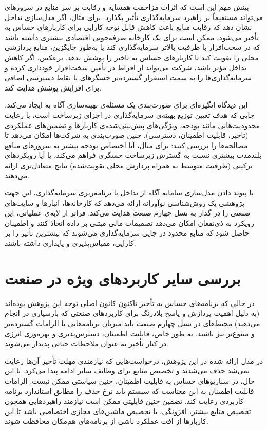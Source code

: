 بینش مهم این است که اثرات مزاحمت همسایه و رقابت بر سر منابع در سرورهای  می‌تواند مستقیماً بر راهبرد سرمایه‌گذاری تأثیر بگذارد. برای مثال، اگر مدل‌سازی تداخل نشان دهد که رقابت منابع باعث کاهش قابل توجه کارایی  برای کاربارهای حساس به تأخیر می‌شود، ممکن است برای یک کارخانه صرفه‌جویی اقتصادی بیشتری داشته باشد که در سخت‌افزار  با ظرفیت بالاتر سرمایه‌گذاری کند یا به‌طور جایگزین، منابع پردازشی محلی را تقویت کند تا کاربارهای حساس به تاخیر را پوشش بدهد. برعکس، اگر کاهش تداخل مؤثر باشد، شرکت می‌تواند از افراط در تأمین سخت‌افزار  خودداری کرده و سرمایه‌گذاری‌ها را به سمت استقرار گسترده‌تر حسگرهای  یا نقاط دسترسی اضافی برای افزایش پوشش هدایت کند.

این دیدگاه انگیزه‌ای برای صورت‌بندی یک مسئله‌ی بهینه‌سازی آگاه به  ایجاد می‌کند، جایی که هدف تعیین توزیع بهینه‌ی سرمایه‌گذاری در اجزای زیرساخت است، با رعایت محدودیت‌هایی مانند بودجه، ویژگی‌های پیش‌بینی‌شده‌ی کاربارها و تضمین‌های عملکردی (تاخیر، قابلیت اطمینان، دسترسی). چنین صورت‌بندی به شرکت‌ها امکان می‌دهد تا مصالحه‌ها را بررسی کنند: برای مثال، آیا اختصاص بودجه بیشتر به سرورهای  منافع بلندمدت بیشتری نسبت به گسترش زیرساخت حسگری  فراهم می‌کند، یا آیا رویکردهای ترکیبی (ظرفیت متوسط  به همراه پردازش محلی تقویت‌شده) نتایج متعادل‌تری ارائه می‌دهند.

با پیوند دادن مدل‌سازی سامانه آگاه از تداخل با برنامه‌ریزی سرمایه‌گذاری، این جهت پژوهشی یک روش‌شناسی نوآورانه ارائه می‌دهد که کارخانه‌ها، انبارها و سایت‌های صنعتی را در گذار به نسل چهارم صنعت هدایت می‌کند. فراتر از لایه‌ی عملیاتی، این رویکرد به ذی‌نفعان امکان می‌دهد تصمیمات مالی مبتنی بر داده اتخاذ کنند و اطمینان حاصل شود که منابع محدود در جایی سرمایه‌گذاری می‌شوند که بیشترین تأثیر را بر کارایی، مقیاس‌پذیری و پایداری داشته باشند.

\section{بررسی سایر کاربردهای ویژه در صنعت}

در حالی که برنامه‌های حساس به تأخیر تاکنون کانون اصلی توجه این پژوهش بوده‌اند (به دلیل اهمیت پردازش و پاسخ بلادرنگ برای کاربردهای صنعتی که بارسپاری در  انجام می‌دهند) محیط‌های  در نسل چهارم صنعت باید میزبان برنامه‌هایی با الزامات گسترده‌تر و متنوع‌تر نیز باشند. به طور خاص، قابلیت اطمینان، دسترس‌پذیری و بهره‌وری انرژی در کنار تأخیر به عنوان ملاحظات حیاتی پدیدار می‌شوند.

در مدل ارائه شده در این پژوهش، درخواست‌هایی که نیازمندی مهلت تأخیر آن‌ها رعایت نمی‌شد حذف می‌شدند و تخصیص منابع برای وظایف سایر ادامه پیدا می‌کرد. با این حال، در سناریوهای حساس به قابلیت اطمینان، چنین سیاستی ممکن نیست. الزامات قابلیت اطمینان به این معناست که سیستم باید نرخ حذف را مطابق استاندارد برنامه کاربردی رعایت کند. تضمین چنین قابلیتی ممکن است نیازمند راهبردهایی همچون تخصیص منابع بیشتر، افزونگی، یا تخصیص ماشین‌های مجازی اختصاصی باشد تا این کاربارها از افت عملکرد ناشی از برنامه‌های هم‌مکان محافظت شوند.

